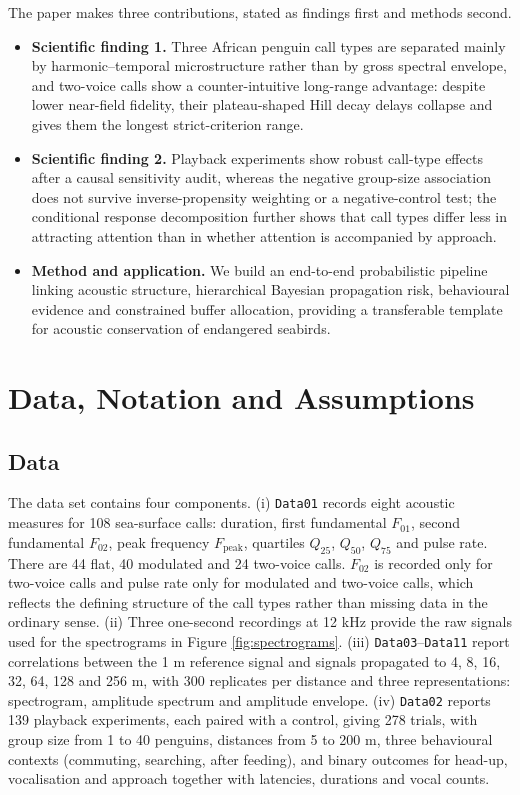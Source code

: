 \documentclass{apmcmthesis}
\begin{document}
The paper makes three contributions, stated as findings first and methods second.
\begin{itemize}
\item \textbf{Scientific finding 1.} Three African penguin call types are separated mainly by harmonic--temporal microstructure rather than by gross spectral envelope, and two-voice calls show a counter-intuitive long-range advantage: despite lower near-field fidelity, their plateau-shaped Hill decay delays collapse and gives them the longest strict-criterion range.
\item \textbf{Scientific finding 2.} Playback experiments show robust call-type effects after a causal sensitivity audit, whereas the negative group-size association does not survive inverse-propensity weighting or a negative-control test; the conditional response decomposition further shows that call types differ less in attracting attention than in whether attention is accompanied by approach.
\item \textbf{Method and application.} We build an end-to-end probabilistic pipeline linking acoustic structure, hierarchical Bayesian propagation risk, behavioural evidence and constrained buffer allocation, providing a transferable template for acoustic conservation of endangered seabirds.
\end{itemize}

\section{Data, Notation and Assumptions}

\subsection{Data}

The data set contains four components. (i) \texttt{Data01} records eight acoustic measures for 108 sea-surface calls: duration, first fundamental $F_{01}$, second fundamental $F_{02}$, peak frequency $F_{\mathrm{peak}}$, quartiles $Q_{25}$, $Q_{50}$, $Q_{75}$ and pulse rate. There are 44 flat, 40 modulated and 24 two-voice calls. $F_{02}$ is recorded only for two-voice calls and pulse rate only for modulated and two-voice calls, which reflects the defining structure of the call types rather than missing data in the ordinary sense. (ii) Three one-second recordings at 12 kHz provide the raw signals used for the spectrograms in Figure \ref{fig:spectrograms}. (iii) \texttt{Data03}--\texttt{Data11} report correlations between the 1 m reference signal and signals propagated to 4, 8, 16, 32, 64, 128 and 256 m, with 300 replicates per distance and three representations: spectrogram, amplitude spectrum and amplitude envelope. (iv) \texttt{Data02} reports 139 playback experiments, each paired with a control, giving 278 trials, with group size from 1 to 40 penguins, distances from 5 to 200 m, three behavioural contexts (commuting, searching, after feeding), and binary outcomes for head-up, vocalisation and approach together with latencies, durations and vocal counts.
\end{document}
